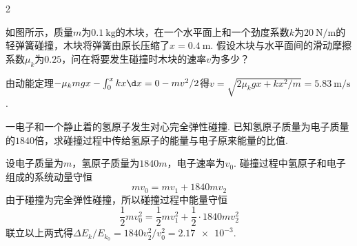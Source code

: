 \begin{paracol}{2}
\begin{problem}
    如图所示，质量$m$为$\qty{0.1}\kg$的木块，在一个水平面上和一个劲度系数$k$为$\qty{20}{\N/\m}$的轻弹簧碰撞，木块将弹簧由原长压缩了$x=\qty{0.4}\m$. 假设木块与水平面间的滑动摩擦系数$\mu_k$为$0.25$，问在将要发生碰撞时木块的速率$v$为多少？
    \switchcolumn\vspace*{\fill}\centering
    \vspace*{\fill}
\end{problem}
\end{paracol}
\begin{solution}
    由动能定理$-\mu_kmgx-\int_0^xkx\d x=0-mv^2/2$得$v=\sqrt{2\mu_kgx+kx^2/m}=\qty{5.83}{\m/\s}$.
\end{solution}

\begin{problem} %
    一电子和一个静止着的氢原子发生对心完全弹性碰撞. 已知氢原子质量为电子质量的$1840$倍，求碰撞过程中传给氢原子的能量与电子原来能量的比值.
\end{problem}
\begin{solution}
    设电子质量为$m$，氢原子质量为$1840m$，电子速率为$v_0$. 碰撞过程中氢原子和电子组成的系统动量守恒
    \[mv_0=mv_1+1840mv_2\]
    由于碰撞为完全弹性碰撞，所以碰撞过程中能量守恒
    \[\frac12mv_0^2=\frac12mv_1^2+\frac12\cdot 1840 mv_2^2\]
    联立以上两式得$\Delta E_k/E_{k_0}=1840v_2^2/v_0^2=\num{2.17e-3}$.
\end{solution}

